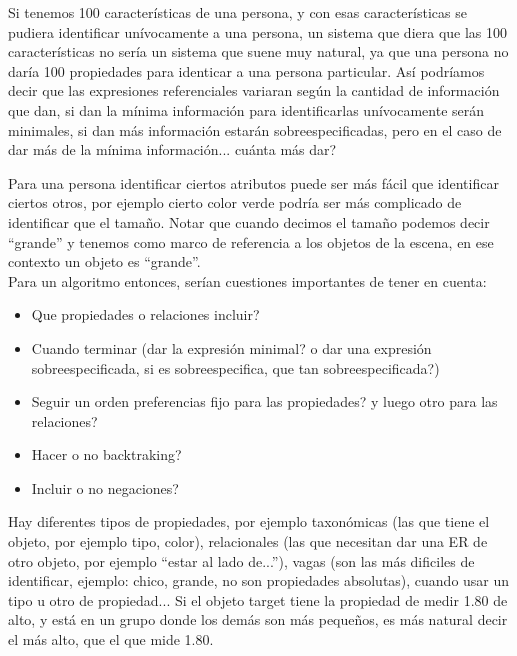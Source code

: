Si tenemos 100 caracter\'isticas de una persona, y con esas caracter\'isticas se pudiera identificar un\'ivocamente a una persona, un sistema que diera que las 100 caracter\'isticas no ser\'ia un sistema que suene muy natural, ya que una persona no dar\'ia 100 propiedades para identicar a una persona particular. As\'i podr\'iamos decir que las expresiones referenciales variaran seg\'un la cantidad de informaci\'on que dan, si dan la m\'inima informaci\'on para identificarlas un\'ivocamente ser\'an minimales, si dan m\'as informaci\'on estar\'an sobreespecificadas, pero en el caso de dar m\'as de la m\'inima informaci\'on... cu\'anta m\'as dar?


Para una persona identificar ciertos atributos puede ser m\'as f\'acil que identificar ciertos otros, por ejemplo cierto color verde podr\'{i}a ser m\'as complicado de identificar que el tama\~no. Notar que cuando decimos el tama\~no podemos decir ``grande'' y tenemos como marco de referencia a los objetos de la escena, en ese contexto un objeto es ``grande''.\\

Para un algoritmo entonces, ser\'ian cuestiones importantes de tener en cuenta:

\begin{itemize}
 \item Que propiedades o relaciones incluir?
 \item Cuando terminar (dar la expresi\'on minimal? o dar una expresi\'on sobreespecificada, si es sobreespecifica, que tan sobreespecificada?)
 \item Seguir un orden preferencias fijo para las propiedades? y luego otro para las relaciones?
 \item Hacer o no backtraking?
 \item Incluir o no negaciones?
\end{itemize}


Hay diferentes tipos de propiedades, por ejemplo taxon\'omicas (las que tiene el objeto, por ejemplo tipo, color), relacionales (las que necesitan dar una ER de otro objeto, por ejemplo ``estar al lado de...''), vagas (son las m\'as dificiles de identificar, ejemplo: chico, grande, no son propiedades absolutas), cuando usar un tipo u otro de propiedad... 
Si el objeto target tiene la propiedad de medir 1.80 de alto, y est\'a en un grupo donde los dem\'as son m\'as peque\~nos, es m\'as natural decir el m\'as alto, que el que mide 1.80.\\


